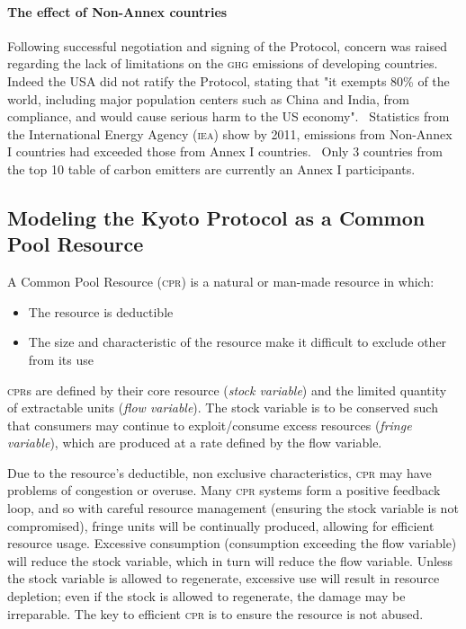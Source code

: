 \paragraph{The effect of Non-Annex countries}

Following successful negotiation and signing of the Protocol, concern was raised regarding the lack of limitations on the \textsc{ghg} emissions of developing countries. Indeed the \textsc{USA} did not ratify the Protocol, stating that "it exempts 80\% of the world, including major population centers such as China and India, from compliance, and would cause serious harm to the US economy".~\cite{Hague-to-Marrakesh} Statistics from the International Energy Agency (\textsc{iea}) show by 2011, emissions from Non-Annex I countries had exceeded those from Annex I countries.~\cite{IEA-highlights} Only 3 countries from the top 10 table of carbon emitters are currently an Annex I participants.

\subsection{Modeling the Kyoto Protocol as a Common Pool Resource}

A Common Pool Resource (\textsc{cpr}) is a natural or man-made resource in which:~\cite{Ostrom-90}

\begin{itemize}
	\item The resource is deductible
	\item The size and characteristic of the resource make it difficult to exclude other from its use
\end{itemize}

\textsc{cpr}s are defined by their core resource (\emph{stock variable}) and the limited quantity of extractable units (\emph{flow variable}). The stock variable is to be conserved such that consumers may continue to exploit/consume excess resources (\emph{fringe variable}), which are produced at a rate defined by the flow variable.

Due to the resource's deductible, non exclusive characteristics, \textsc{cpr} may have problems of congestion or overuse. Many \textsc{cpr} systems form a positive feedback loop, and so with careful resource management (ensuring the stock variable is not compromised), fringe units will be continually produced, allowing for efficient resource usage. Excessive consumption (consumption exceeding the flow variable) will reduce the stock variable, which in turn will reduce the flow variable. Unless the stock variable is allowed to regenerate, excessive use will result in resource depletion; even if the stock is allowed to regenerate, the damage may be irreparable. The key to efficient \textsc{cpr} is to ensure the resource is not abused.


